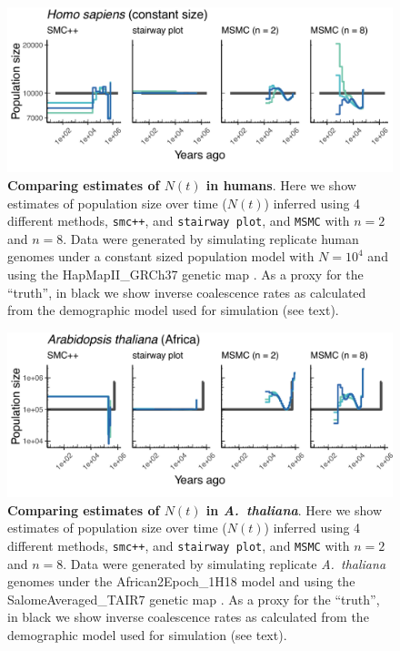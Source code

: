 \documentclass[12pt,halfline,a4paper]{ouparticle}
\newcommand{\MSMC}{\texttt{MSMC}\xspace}
\newcommand{\smcpp}{\texttt{smc++}\xspace}
\begin{document}
\begin{figure}
\begin{center}
\includegraphics[width=0.8\linewidth]{display_items/HomSap_constant_size.pdf}
\caption{\textbf{Comparing estimates of $N(t)$ in humans}. Here we show estimates of population
size over time ($N(t)$) inferred using 4 different methods, \smcpp, and \texttt{stairway plot}, and
\MSMC with $n=2$ and $n=8$. Data were generated by simulating
replicate human genomes under a constant sized population model with $N=10^4$
and using the HapMapII\_GRCh37 genetic map \citep{international2007second}.
As a proxy for the ``truth'', in black we show inverse coalescence rates
as calculated from the demographic model used for simulation (see text).
}
\label{fig:n_t_HomSap_constant}
\end{center}
\end{figure}

\begin{figure}
\begin{center}
\includegraphics[width=0.8\linewidth]{display_items/AraTha_African2Epoch_1H18.pdf}
\caption{\textbf{Comparing estimates of $N(t)$ in \textit{A.~thaliana}}. Here we show estimates of population
size over time ($N(t)$) inferred using 4 different methods, \smcpp, and \texttt{stairway plot}, and
\MSMC with $n=2$ and $n=8$. Data were generated by simulating
replicate \textit{A.~thaliana} genomes under the African2Epoch\_1H18 model \citep{durvasula2017african}
and using the SalomeAveraged\_TAIR7 genetic map \citep{salome2011recombination}.
As a proxy for the ``truth'', in black we show inverse coalescence rates
as calculated from the demographic model used for simulation (see text).
}
\label{fig:n_t_AraTha}
\end{center}
\end{figure}
\end{document}
